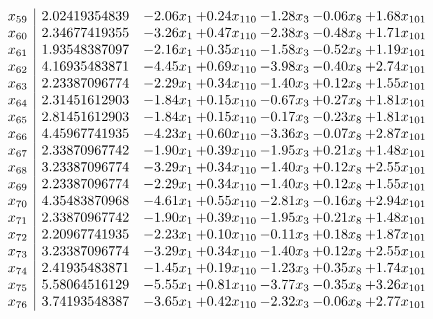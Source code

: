 \documentclass[8pt]{article}
\begin{document}
\[\begin{array}{c| c c@{\hskip 2pt} c@{\hskip 2pt} c@{\hskip 2pt} c@{\hskip 2pt} c@{\hskip 2pt} }
 x_{59}   &  2.02419354839 & -2.06 x_{1} & +  0.24 x_{110} & -1.28 x_{3} & -0.06 x_{8} & +  1.68 x_{101}\\
 x_{60}   &  2.34677419355 & -3.26 x_{1} & +  0.47 x_{110} & -2.38 x_{3} & -0.48 x_{8} & +  1.71 x_{101}\\
 x_{61}   &  1.93548387097 & -2.16 x_{1} & +  0.35 x_{110} & -1.58 x_{3} & -0.52 x_{8} & +  1.19 x_{101}\\
 x_{62}   &  4.16935483871 & -4.45 x_{1} & +  0.69 x_{110} & -3.98 x_{3} & -0.40 x_{8} & +  2.74 x_{101}\\
 x_{63}   &  2.23387096774 & -2.29 x_{1} & +  0.34 x_{110} & -1.40 x_{3} & +  0.12 x_{8} & +  1.55 x_{101}\\
 x_{64}   &  2.31451612903 & -1.84 x_{1} & +  0.15 x_{110} & -0.67 x_{3} & +  0.27 x_{8} & +  1.81 x_{101}\\
 x_{65}   &  2.81451612903 & -1.84 x_{1} & +  0.15 x_{110} & -0.17 x_{3} & -0.23 x_{8} & +  1.81 x_{101}\\
 x_{66}   &  4.45967741935 & -4.23 x_{1} & +  0.60 x_{110} & -3.36 x_{3} & -0.07 x_{8} & +  2.87 x_{101}\\
 x_{67}   &  2.33870967742 & -1.90 x_{1} & +  0.39 x_{110} & -1.95 x_{3} & +  0.21 x_{8} & +  1.48 x_{101}\\
 x_{68}   &  3.23387096774 & -3.29 x_{1} & +  0.34 x_{110} & -1.40 x_{3} & +  0.12 x_{8} & +  2.55 x_{101}\\
 x_{69}   &  2.23387096774 & -2.29 x_{1} & +  0.34 x_{110} & -1.40 x_{3} & +  0.12 x_{8} & +  1.55 x_{101}\\
 x_{70}   &  4.35483870968 & -4.61 x_{1} & +  0.55 x_{110} & -2.81 x_{3} & -0.16 x_{8} & +  2.94 x_{101}\\
 x_{71}   &  2.33870967742 & -1.90 x_{1} & +  0.39 x_{110} & -1.95 x_{3} & +  0.21 x_{8} & +  1.48 x_{101}\\
 x_{72}   &  2.20967741935 & -2.23 x_{1} & +  0.10 x_{110} & -0.11 x_{3} & +  0.18 x_{8} & +  1.87 x_{101}\\
 x_{73}   &  3.23387096774 & -3.29 x_{1} & +  0.34 x_{110} & -1.40 x_{3} & +  0.12 x_{8} & +  2.55 x_{101}\\
 x_{74}   &  2.41935483871 & -1.45 x_{1} & +  0.19 x_{110} & -1.23 x_{3} & +  0.35 x_{8} & +  1.74 x_{101}\\
 x_{75}   &  5.58064516129 & -5.55 x_{1} & +  0.81 x_{110} & -3.77 x_{3} & -0.35 x_{8} & +  3.26 x_{101}\\
 x_{76}   &  3.74193548387 & -3.65 x_{1} & +  0.42 x_{110} & -2.32 x_{3} & -0.06 x_{8} & +  2.77 x_{101}\\

\end{array}\]
\end{document}

